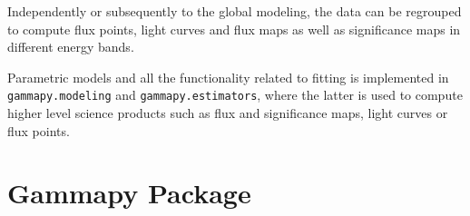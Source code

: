 \documentclass[longauth]{aa}
\newcommand{\code}[1]{\texttt{#1}}
\newcommand{\gammapy}{Gammapy\xspace}
\newcommand{\gammarays}{$\gamma$-rays\xspace}
\begin{document}
Independently or subsequently to the global modeling, the data can be regrouped to compute
flux points, light curves and flux maps as well as significance maps in different energy bands.

Parametric models and all the functionality related to fitting is implemented in 
\code{gammapy.modeling} and \code{gammapy.estimators}, where the latter is used to
compute higher level science products such as flux and significance maps,
light curves or flux points. 



 
 
 
 
 
 

\section{\gammapy Package}
\label{sec:gammapy-package}
\end{document}
